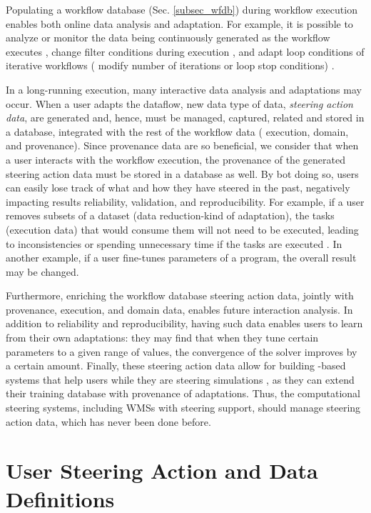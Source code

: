 Populating a workflow database (Sec. \ref{subsec_wfdb}) during workflow execution enables both online data analysis and adaptation.
For example, it is possible to analyze or monitor the data being continuously generated as the workflow executes \cite{Silva2017Raw},
change filter conditions during execution \cite{Dias2011Supporting},
and adapt loop conditions of iterative workflows (\eg{} modify number of iterations or loop stop conditions)
\cite{Dias2015Data-centric}.

In a long-running execution, many interactive data analysis and
adaptations may occur.
When a user adapts the dataflow, new data type of data, \textit{steering action data}, are generated and, hence, must be managed,
\ie{} captured, related and stored in a database, integrated with the rest of the workflow data (\ie{} execution, domain, and provenance).
Since provenance data are so beneficial, we consider that when a user
interacts with the workflow execution, the provenance of the generated steering action data must be stored in a database as well.
By bot doing so, users can easily lose track of what and how they
have steered in the past, negatively impacting results reliability, validation, and
reproducibility.
For example, if a user removes subsets of a dataset (data reduction-kind of adaptation),
the tasks (execution data) that would consume them will not need to be
executed, leading to inconsistencies or spending unnecessary time if the tasks are executed \cite{Souza2017Data}.
In another example, if a user fine-tunes parameters of a program, the overall result may be
changed.

Furthermore, enriching the workflow database steering action data,
jointly with provenance, execution, and domain data, enables future interaction
analysis. In addition to reliability and reproducibility, having such
data enables users to learn from their own adaptations: they may find
that when they tune certain parameters to a given range of values, the
convergence of the solver improves by a certain amount. Finally, these
steering action data allow for building -based systems that help users
while they are steering simulations \cite{Silva2018JobPruner:},
as they can extend their training database with provenance of
adaptations. Thus, the computational steering systems, including WMSs with steering support, should
manage steering action data, which has never been done before.


\section{User Steering Action and Data Definitions}
\label{user_steering_def}


